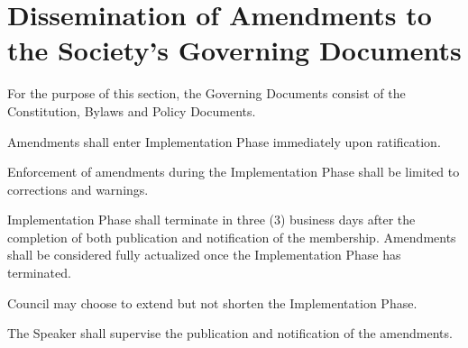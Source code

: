 \section{Dissemination of Amendments to the Society's Governing Documents}
\begin{longenum}[ label*=\thesection.\arabic*., align=left]
	\item For the purpose of this section, the Governing Documents consist of the Constitution, Bylaws and Policy Documents.
    \item Amendments shall enter Implementation Phase immediately upon ratification. 
    \item Enforcement of amendments during the Implementation Phase shall be limited to corrections and warnings. 
    \item Implementation Phase shall terminate in three (3) business days after the completion of both publication and notification of the membership. Amendments shall be considered fully actualized once the Implementation Phase has terminated.
    \item Council may choose to extend but not shorten the Implementation Phase. 
    \item The Speaker shall supervise the publication and notification of the amendments.
\end{longenum}
\newpage


